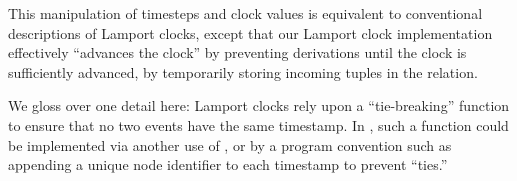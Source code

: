 This manipulation of timesteps and clock values is equivalent to
conventional descriptions of Lamport clocks, except that our Lamport
clock implementation effectively ``advances the clock'' by preventing derivations until the clock is sufficiently advanced, by temporarily storing incoming tuples
in the  relation.

We gloss over one detail here: Lamport clocks rely
upon a ``tie-breaking'' function to ensure that no two events have the
same timestamp.  In \lang, such a function could be implemented via another use of , or by a program convention such as
appending a unique node identifier to each timestamp to prevent ``ties.''

